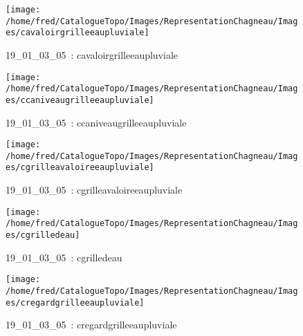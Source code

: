 \documentclass[12pt,titlepage]{book}
\begin{document}
\begin{figure}[h!]
\begin{minipage}[t]{3cm}
  \end{minipage}
  \begin{minipage}[t]{3cm}
    \begin{center}
      \texttt{[image: /home/fred/CatalogueTopo/Images/RepresentationChagneau/Images/cavaloirgrilleeaupluviale]}
      \caption[~19\_01\_03\_05]{\small{19\_01\_03\_05~:} \tiny{cavaloirgrilleeaupluviale}}\label{cavaloirgrilleeaupluviale}
    \end{center}
  \end{minipage}
  \begin{minipage}[t]{3cm}
    \begin{center}
      \texttt{[image: /home/fred/CatalogueTopo/Images/RepresentationChagneau/Images/ccaniveaugrilleeaupluviale]}
      \caption[~19\_01\_03\_05]{\small{19\_01\_03\_05~:} \tiny{ccaniveaugrilleeaupluviale}}\label{ccaniveaugrilleeaupluviale}
    \end{center}
  \end{minipage}
  \begin{minipage}[t]{3cm}
    \begin{center}
      \texttt{[image: /home/fred/CatalogueTopo/Images/RepresentationChagneau/Images/cgrilleavaloireeaupluviale]}
      \caption[~19\_01\_03\_05]{\small{19\_01\_03\_05~:} \tiny{cgrilleavaloireeaupluviale}}\label{cgrilleavaloireeaupluviale}
    \end{center}
  \end{minipage}
  \begin{minipage}[t]{3cm}
    \begin{center}
      \texttt{[image: /home/fred/CatalogueTopo/Images/RepresentationChagneau/Images/cgrilledeau]}
      \caption[~19\_01\_03\_05]{\small{19\_01\_03\_05~:} \tiny{cgrilledeau}}\label{cgrilledeau}
    \end{center}
  \end{minipage}
  \begin{minipage}[t]{3cm}
    \begin{center}
      \texttt{[image: /home/fred/CatalogueTopo/Images/RepresentationChagneau/Images/cregardgrilleeaupluviale]}
      \caption[~19\_01\_03\_05]{\small{19\_01\_03\_05~:} \tiny{cregardgrilleeaupluviale}}\label{cregardgrilleeaupluviale}
    \end{center}

\end{minipage}
\end{figure}
\end{document}
